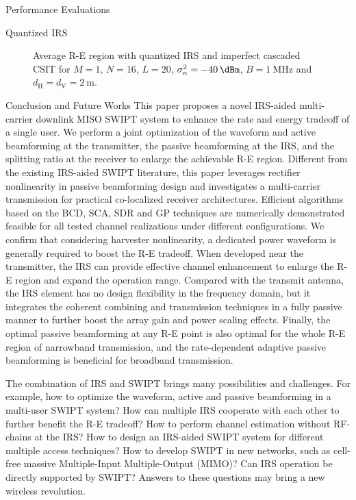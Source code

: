 \documentclass[journal]{IEEEtran}
\begin{document}
\begin{section}{Performance Evaluations}
\begin{subsection}{Quantized IRS}
			\begin{figure}[!t]
				\centering
				\caption{Average R-E region with quantized IRS and imperfect cascaded CSIT for $M=1$, $N=16$, $L=20$, $\sigma_n^2=\SI{-40}{\dBm}$, $B=\SI{1}{\MHz}$ and $d_{\mathrm{H}}=d_{\mathrm{V}}=\SI{2}{\meter}$.}
			\end{figure}
		\end{subsection}
	\end{section}


	\begin{section}{Conclusion and Future Works}\label{se:conclusion_and_future_works}
		This paper proposes a novel IRS-aided multi-carrier downlink MISO SWIPT system to enhance the rate and energy tradeoff of a single user. We perform a joint optimization of the waveform and active beamforming at the transmitter, the passive beamforming at the IRS, and the splitting ratio at the receiver to enlarge the achievable R-E region. Different from the existing IRS-aided SWIPT literature, this paper leverages rectifier nonlinearity in passive beamforming design and investigates a multi-carrier transmission for practical co-localized receiver architectures. Efficient algorithms based on the BCD, SCA, SDR and GP techniques are numerically demonstrated feasible for all tested channel realizations under different configurations. We confirm that considering harvester nonlinearity, a dedicated power waveform is generally required to boost the R-E tradeoff. When developed near the transmitter, the IRS can provide effective channel enhancement to enlarge the R-E region and expand the operation range. Compared with the transmit antenna, the IRS element has no design flexibility in the frequency domain, but it integrates the coherent combining and transmission techniques in a fully passive manner to further boost the array gain and power scaling effects. Finally, the optimal passive beamforming at any R-E point is also optimal for the whole R-E region of narrowband transmission, and the rate-dependent adaptive passive beamforming is beneficial for broadband transmission.

		The combination of IRS and SWIPT brings many possibilities and challenges. For example, how to optimize the waveform, active and passive beamforming in a multi-user SWIPT system? How can multiple IRS cooperate with each other to further benefit the R-E tradeoff? How to perform channel estimation without RF-chains at the IRS? How to design an IRS-aided SWIPT system for different multiple access techniques? How to develop SWIPT in new networks, such as cell-free massive Multiple-Input Multiple-Output (MIMO)? Can IRS operation be directly supported by SWIPT? Answers to these questions may bring a new wireless revolution.
	\end{section}


	
	
\end{document}
